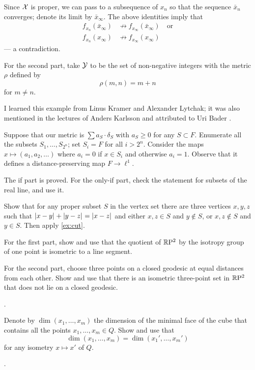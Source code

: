 Since $\mathcal{X}$ is proper, we can pass to a subsequence of $x_n$ so that the sequence  $\bar x_n$ converges;
denote its limit by $\bar x_\infty$.
The above identities imply that
\begin{align*}
f_{x_n}(\bar x_\infty)&\not\to f_{x_\infty}(\bar x_\infty)
\quad
\text{or}
\\
f_{x_n}(x_\infty)&\not\to f_{x_\infty}( x_\infty)
\end{align*}
--- a contradiction.

For the second part, take $\mathcal{Y}$ to be the set of non-negative integers with the metric $\rho$ defined by
\[\rho(m,n)=m+n\] 
for $m\ne n$.

\medskip

I learned this example from Linus Kramer and Alexander Lytchak;
it was also mentioned in the lectures of Anders Karlsson
and attributed to Uri Bader \cite[2.3]{karlsson}.

Suppose that our metric is $\sum a_S\cdot\delta_S$ with $a_S\ge 0$ for any $S\subset F$.
Enumerate all the subsets $S_1,\dots,S_{2^n}$;
set $S_i=F$ for all $i>2^n$. 
Consider the maps $x\mapsto (a_1,a_2,\dots)$ where $a_i=0$ if $x\in S_i$ and otherwise $a_i=1$.
Observe that it defines a distance-preserving map $F\to \ell^1$. 

The if part is proved.
For the only-if part, check the statement for subsets of the real line, and use it.

Show that for any proper subset $S$ in the vertex set there are three vertices $x,y,z$ such that $\dist{x}{y}{} +\dist{y}{z}{}=\dist{x}{z}{}$ and either 
$x,z\in S$ and $y\notin S$, or $x,z\notin S$ and $y\in S$.
Then apply \ref{ex:cut}.

For the first part, show and use that the quotient of $\mathbb{R}\mathrm{P}^2$ by the isotropy group of one point is isometric to a line segment.

For the second part, choose three points on a closed geodesic at equal distances from each other.
Show and use that there is an isometric three-point set in $\mathbb{R}\mathrm{P}^2$ that does not lie on a closed geodesic.

 \cite[V \S 2]{busemann-1942}.

Denote by $\dim(x_1,\dots,x_m)$ the dimension of the minimal face of the cube that contains all the points $x_1,\dots,x_m\in Q$.
Show and use that 
\[\dim(x_1,\dots,x_m)=\dim(x_1',\dots,x_m')\]
for any isometry $x\mapsto x'$ of $Q$.

 \cite[prop. 6 and 7]{berestovskii-nikonorov}.
